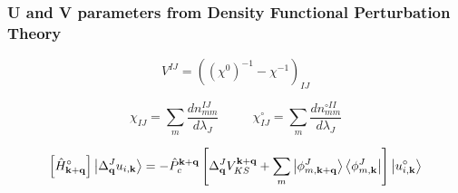 \subsubsection{U and V parameters from Density Functional Perturbation Theory}

\begin{equation}
V^{I J} = ((\chi^0)^{-1} - \chi^{-1})_{I J}
\label{eq:Vparam}
\end{equation}

\begin{equation}
\chi_{I J} = \sum_m \frac{
d n_{mm}^{I J}}{d \lambda_J}
~~~~~~~~~~~~
\chi_{I J}^\circ = \sum_m \frac{
d n_{mm}^{\circ I I}}{d \lambda_J}
\label{eq:chiIJ}
\end{equation}

\begin{equation}
\left [
\hat H^\circ
_{\mathbf{k+q}}
\right]
\ket{\Delta_\mathbf{q}^J u_{i,\mathbf{k}}}
=
-\hat P _c^{\mathbf{k+q}}
\left [
\Delta_\mathbf{q}^J V_{KS}^{\mathbf{k+q}} 
+ \sum_m
\ket{\phi^J_{m,\mathbf{k+q}}}
\bra{\phi^J_{m,\mathbf{k}}}
\right]
\ket{u^\circ_{i,\mathbf{k}}}
\label{eq:LRKSsol}
\end{equation}

